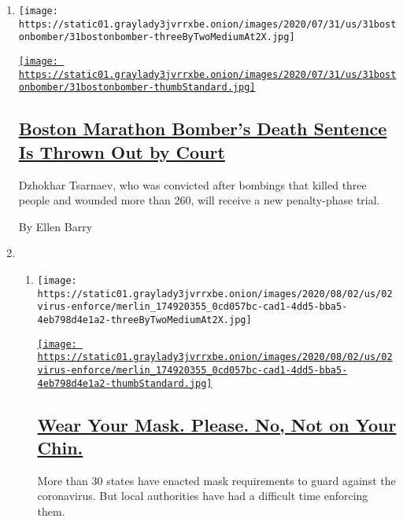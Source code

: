 \begin{enumerate}
\def\labelenumi{\arabic{enumi}.}
\item
  \texttt{[image: https://static01.graylady3jvrrxbe.onion/images/2020/07/31/us/31bostonbomber/31bostonbomber-threeByTwoMediumAt2X.jpg]}

  \href{/2020/07/31/us/dzhokhar-tsarnaev-boston-marathon-bomber.html}{\texttt{[image: https://static01.graylady3jvrrxbe.onion/images/2020/07/31/us/31bostonbomber/31bostonbomber-thumbStandard.jpg]}}

  \hypertarget{boston-marathon-bombers-death-sentence-is-thrown-out-by-court}{%
  \subsection{\texorpdfstring{\href{/2020/07/31/us/dzhokhar-tsarnaev-boston-marathon-bomber.html}{Boston
  Marathon Bomber's Death Sentence Is Thrown Out by
  Court}}{Boston Marathon Bomber's Death Sentence Is Thrown Out by Court}}\label{boston-marathon-bombers-death-sentence-is-thrown-out-by-court}}

  Dzhokhar Tsarnaev, who was convicted after bombings that killed three
  people and wounded more than 260, will receive a new penalty-phase
  trial.

  By Ellen Barry
\item
  \begin{enumerate}
  \def\labelenumii{\arabic{enumii}.}
  \item
    \texttt{[image: https://static01.graylady3jvrrxbe.onion/images/2020/08/02/us/02virus-enforce/merlin\_174920355\_0cd057bc-cad1-4dd5-bba5-4eb798d4e1a2-threeByTwoMediumAt2X.jpg]}

    \href{/2020/07/31/us/coronavirus-masks-enforcement-key-west.html}{\texttt{[image: https://static01.graylady3jvrrxbe.onion/images/2020/08/02/us/02virus-enforce/merlin\_174920355\_0cd057bc-cad1-4dd5-bba5-4eb798d4e1a2-thumbStandard.jpg]}}

    \hypertarget{wear-your-mask-please-no-not-on-your-chin}{%
    \subsection{\texorpdfstring{\href{/2020/07/31/us/coronavirus-masks-enforcement-key-west.html}{Wear
    Your Mask. Please. No, Not on Your
    Chin.}}{Wear Your Mask. Please. No, Not on Your Chin.}}\label{wear-your-mask-please-no-not-on-your-chin}}

    More than 30 states have enacted mask requirements to guard against
    the coronavirus. But local authorities have had a difficult time
    enforcing them.


\end{enumerate}
\end{enumerate}
